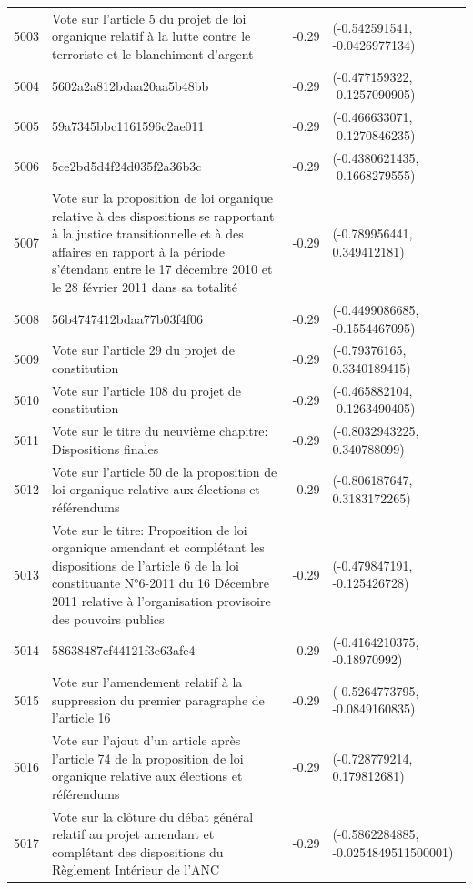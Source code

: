 \begin{table}[ht]
\begin{tabular}{rlrl}
  5003 & Vote sur l'article 5 du projet de loi organique relatif à la lutte contre le terroriste et le blanchiment d'argent & -0.29 & (-0.542591541, -0.0426977134) \\ 
  5004 & 5602a2a812bdaa20aa5b48bb & -0.29 & (-0.477159322, -0.1257090905) \\ 
  5005 & 59a7345bbc1161596c2ae011 & -0.29 & (-0.466633071, -0.1270846235) \\ 
  5006 & 5ce2bd5d4f24d035f2a36b3c & -0.29 & (-0.4380621435, -0.1668279555) \\ 
  5007 & Vote sur la proposition de loi organique relative à des dispositions se rapportant à la justice transitionnelle et à des affaires en rapport à la période s'étendant entre le 17 décembre 2010 et le 28 février 2011 dans sa totalité & -0.29 & (-0.789956441, 0.349412181) \\ 
  5008 & 56b4747412bdaa77b03f4f06 & -0.29 & (-0.4499086685, -0.1554467095) \\ 
  5009 & Vote sur l'article 29 du projet de constitution & -0.29 & (-0.79376165, 0.3340189415) \\ 
  5010 & Vote sur l'article 108 du projet de constitution & -0.29 & (-0.465882104, -0.1263490405) \\ 
  5011 & Vote sur le titre du neuvième chapitre: Dispositions finales & -0.29 & (-0.8032943225, 0.340788099) \\ 
  5012 & Vote sur l'article 50 de la proposition de loi organique relative aux élections et référendums & -0.29 & (-0.806187647, 0.3183172265) \\ 
  5013 & Vote sur le titre: Proposition de loi organique amendant et complétant les dispositions de l'article 6 de la loi constituante N°6-2011 du 16 Décembre 2011 relative à l'organisation provisoire des pouvoirs publics & -0.29 & (-0.479847191, -0.125426728) \\ 
  5014 & 58638487cf44121f3e63afe4 & -0.29 & (-0.4164210375, -0.18970992) \\ 
  5015 & Vote sur l'amendement relatif à la suppression du premier paragraphe de l'article 16 & -0.29 & (-0.5264773795, -0.0849160835) \\ 
  5016 & Vote sur l'ajout d'un article après l'article 74 de la proposition de loi organique relative aux élections et référendums & -0.29 & (-0.728779214, 0.179812681) \\ 
  5017 & Vote sur la clôture du débat général relatif au projet amendant et complétant des dispositions du Règlement Intérieur de l'ANC & -0.29 & (-0.5862284885, -0.0254849511500001) \\ 

\end{tabular}
\end{table}
